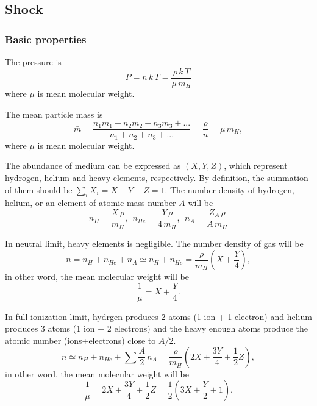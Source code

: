 \bigskip
\subsection{Shock}
\subsubsection{Basic properties}


The pressure is
\begin{equation}
    P = n\,k\,T = \frac{\rho\,k\,T}{\mu\,m_{H}}
\end{equation}
where $\mu$ is mean molecular weight.

\medskip
{}
The mean particle mass is
\begin{equation}
    \bar{m} = \frac{n_{1}m_{1} + n_{2}m_{2} + n_{3}m_{3}+...}{n_{1}+n_{2}+n_{3}+...} = \frac{\rho}{n} = \mu\,m_{H},
\end{equation}
where $\mu$ is mean molecular weight.

The abundance of medium can be expressed as $(X,Y,Z)$, which represent hydrogen, helium and heavy
elements, respectively.  By definition, the summation of them should be $\displaystyle\sum_{i}
X_{i} = X+Y+Z = 1$. The number density of hydrogen, helium, or an element of atomic mass number $A$ will be
\begin{equation}
    n_{H} = \frac{X\,\rho}{m_{H}},~~n_{He}=\frac{Y\,\rho}{4\,m_{H}},~~n_{A}=\frac{Z_{A}\,\rho}{A\,m_{H}}
\end{equation}

In neutral limit, heavy elements is negligible. The number density of gas will be
\begin{equation}
    n = n_{H} + n_{He} + n_{A} \simeq n_{H} + n_{He} = \frac{\rho}{m_{H}} \left( X+\frac{Y}{4} \right),
\end{equation}
in other word, the mean molecular weight will be
\begin{equation}
    \frac{1}{\mu} = X+\frac{Y}{4}.
\end{equation}


In full-ionization limit, hydrgen produces 2 atoms (1 ion + 1 electron) and helium produces 3 atoms (1 ion + 2 electrons) 
and the heavy enough atoms produce the atomic number (ions+electrons) close to $A/2$.
\begin{equation}
    n \simeq n_{H} + n_{He} + \sum \frac{A}{2}\,n_{A} = \frac{\rho}{m_{H}} \left( 2X+\frac{3Y}{4}+\frac{1}{2}Z \right),
\end{equation}
in other word, the mean molecular weight will be
\begin{equation}
    \frac{1}{\mu} = 2X+\frac{3Y}{4}+\frac{1}{2}Z = \frac{1}{2}\left( 3X + \frac{Y}{2} + 1 \right).
\end{equation}

